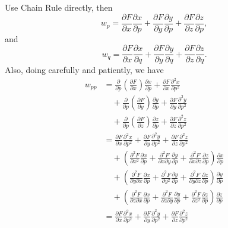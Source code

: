 \begin{Exercise}
\begin{solution}
Use Chain Rule directly, then
$$
w_p 
= \frac{\partial F}{\partial x} \frac{\partial x}{\partial p}
+ \frac{\partial F}{\partial y} \frac{\partial y}{\partial p}
+ \frac{\partial F}{\partial z} \frac{\partial z}{\partial p},
$$
and
$$
w_q
= \frac{\partial F}{\partial x} \frac{\partial x}{\partial q}
+ \frac{\partial F}{\partial y} \frac{\partial y}{\partial q}
+ \frac{\partial F}{\partial z} \frac{\partial z}{\partial q}.
$$
Also, doing carefully and patiently, we have
\begin{align*}
w_{pp}
&= \frac{\partial}{\partial p}\left(\frac{\partial F}{\partial x} \right)\frac{\partial x}{\partial p} + \frac{\partial F}{\partial x}\frac{\partial^2 x}{\partial p^2} \\
&\quad +\frac{\partial}{\partial p}\left(\frac{\partial F}{\partial y} \right)\frac{\partial y}{\partial p} + \frac{\partial F}{\partial y}\frac{\partial^2 y}{\partial p^2} \\
&\quad +\frac{\partial}{\partial p}\left(\frac{\partial F}{\partial z} \right)\frac{\partial z}{\partial p} + \frac{\partial F}{\partial z}\frac{\partial^2 z}{\partial p^2} \\
&= \frac{\partial F}{\partial x}\frac{\partial^2 x}{\partial p^2} + \frac{\partial F}{\partial y}\frac{\partial^2 y}{\partial p^2} + \frac{\partial F}{\partial z}\frac{\partial^2 z}{\partial p^2} \\
&\quad + \left( \frac{\partial^2 F}{\partial x^2}\frac{\partial x}{\partial p} + \frac{\partial^2 F}{\partial x \partial y}\frac{\partial y}{\partial p} + \frac{\partial^2 F}{\partial x \partial z}\frac{\partial z}{\partial p}\right)\frac{\partial x}{\partial p} \\
&\quad + \left( \frac{\partial^2 F}{\partial y \partial x}\frac{\partial x}{\partial p} + \frac{\partial^2 F}{\partial y^2}\frac{\partial y}{\partial p} + \frac{\partial^2 F}{\partial y \partial z}\frac{\partial z}{\partial p}\right)\frac{\partial y}{\partial p} \\
&\quad + \left( \frac{\partial^2 F}{\partial z \partial x}\frac{\partial x}{\partial p} + \frac{\partial^2 F}{\partial z \partial y}\frac{\partial y}{\partial p} + \frac{\partial^2 F}{\partial z^2}\frac{\partial z}{\partial p}\right)\frac{\partial z}{\partial p} \\
&= \frac{\partial F}{\partial x}\frac{\partial^2 x}{\partial p^2} + \frac{\partial F}{\partial y}\frac{\partial^2 y}{\partial p^2} + \frac{\partial F}{\partial z}\frac{\partial^2 z}{\partial p^2} \\

\end{align*}
\end{solution}
\end{Exercise}
